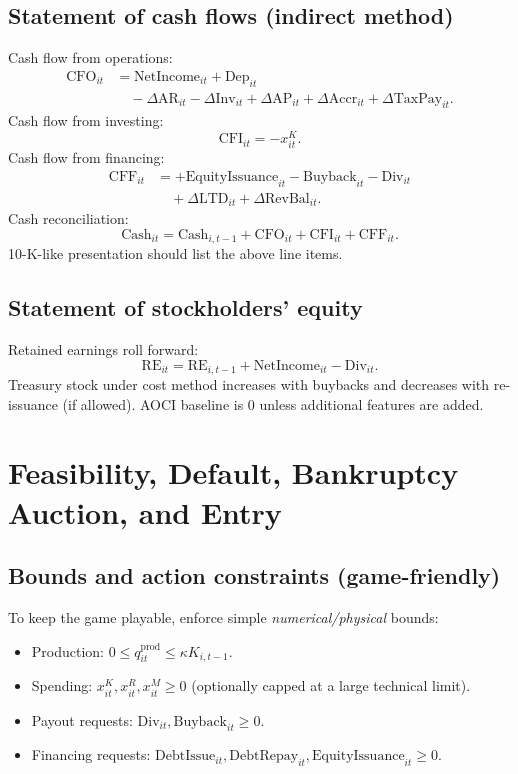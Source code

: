 \documentclass[11pt]{article}
\begin{document}
\subsection{Statement of cash flows (indirect method)}\label{sec:scf}
Cash flow from operations:
\begin{align}
\text{CFO}_{it} &= \text{NetIncome}_{it} + \text{Dep}_{it} \\
&\quad -\Delta \text{AR}_{it} - \Delta \text{Inv}_{it} + \Delta \text{AP}_{it} + \Delta \text{Accr}_{it} + \Delta \text{TaxPay}_{it}.
\end{align}
Cash flow from investing:
\[
\text{CFI}_{it} = -x^K_{it}.
\]
Cash flow from financing:
\begin{align}
\text{CFF}_{it} &= +\text{EquityIssuance}_{it} - \text{Buyback}_{it} - \text{Div}_{it} \\
&\quad + \Delta \text{LTD}_{it} + \Delta \text{RevBal}_{it}.
\end{align}
Cash reconciliation:
\[
\text{Cash}_{it}=\text{Cash}_{i,t-1}+\text{CFO}_{it}+\text{CFI}_{it}+\text{CFF}_{it}.
\]
10-K-like presentation should list the above line items.

\subsection{Statement of stockholders' equity}
Retained earnings roll forward:
\[
\text{RE}_{it}=\text{RE}_{i,t-1}+\text{NetIncome}_{it}-\text{Div}_{it}.
\]
Treasury stock under cost method increases with buybacks and decreases with re-issuance (if allowed).
AOCI baseline is 0 unless additional features are added.

\section{Feasibility, Default, Bankruptcy Auction, and Entry}

\subsection{Bounds and action constraints (game-friendly)}
To keep the game playable, enforce simple \emph{numerical/physical} bounds:
\begin{itemize}[leftmargin=*]
    \item Production: $0\le q^{\text{prod}}_{it}\le \kappa K_{i,t-1}$.
    \item Spending: $x^K_{it},x^R_{it},x^M_{it}\ge 0$ (optionally capped at a large technical limit).
    \item Payout requests: $\text{Div}_{it},\text{Buyback}_{it}\ge 0$.
    \item Financing requests: $\text{DebtIssue}_{it},\text{DebtRepay}_{it},\text{EquityIssuance}_{it}\ge 0$.
\end{itemize}
\end{document}
